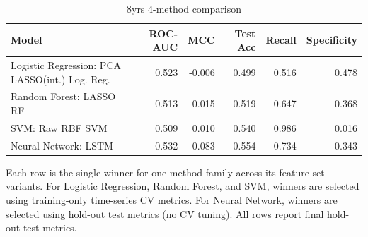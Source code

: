 \begin{table}[htbp]
\centering
\caption{8yrs 4-method comparison}
\label{tab:8yrs_4methods_comparison}
\begin{tabular}{lrrrrr}
\toprule
Model & ROC-AUC & MCC & Test Acc & Recall & Specificity \\
\midrule
Logistic Regression: PCA LASSO(int.) Log. Reg. & 0.523 & -0.006 & 0.499 & 0.516 & 0.478 \\
Random Forest: LASSO RF & 0.513 & 0.015 & 0.519 & 0.647 & 0.368 \\
SVM: Raw RBF SVM & 0.509 & 0.010 & 0.540 & 0.986 & 0.016 \\
Neural Network: LSTM & 0.532 & 0.083 & 0.554 & 0.734 & 0.343 \\
\bottomrule
\end{tabular}
\par\smallskip
\footnotesize Each row is the single winner for one method family across its feature-set variants. For Logistic Regression, Random Forest, and SVM, winners are selected using training-only time-series CV metrics. For Neural Network, winners are selected using hold-out test metrics (no CV tuning). All rows report final hold-out test metrics.
\end{table}
